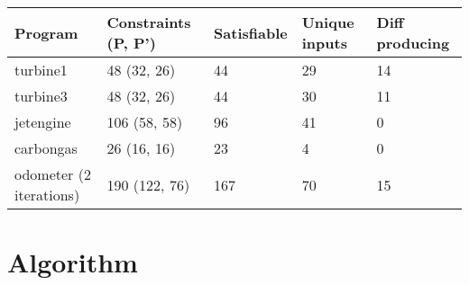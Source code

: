 \documentclass{article}
\begin{document}
\begin{table}[h]
\begin{tabular}{l|llll}
Program                   & Constraints (P, P') & Satisfiable & Unique inputs & Diff producing \\ \hline
turbine1                  & 48 (32, 26)         & 44          & 29            & 14             \\
turbine3                  & 48 (32, 26)         & 44          & 30            & 11             \\
jetengine                 & 106 (58, 58)        & 96          & 41            & 0              \\
carbongas                 & 26 (16, 16)         & 23          & 4             & 0              \\
odometer (2 iterations)   & 190 (122, 76)       & 167         & 70            &
15
\end{tabular}
\end{table}

\section{Algorithm}
\end{document}
